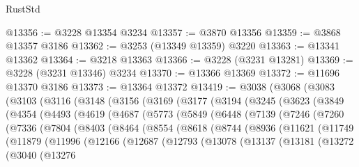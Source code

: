 \begin{lexlean}{RustStd}
\begin{coremodule}
{\begin{coremodule}
{{{{{{{{{{{{{{{{{{{{{{{{{{{{{{{{{{{{{@13356 := @3228 @13354 @3234
@13357 := @3870 @13356
@13359 := @3868 @13357 @3186
@13362 := @3253 (@13349 @13359) @3220
@13363 := @13341 @13362
@13364 := @3218 @13363
@13366 := @3228 (@3231 @13281)
@13369 := @3228 (@3231 @13346) @3234
@13370 := @13366 @13369
@13372 := @11696 @13370 @3186
@13373 := @13364 @13372
@13419 := @3038
    (@3068
      (@3083
        (@3103
          (@3116
            (@3148
              (@3156
                (@3169
                  (@3177
                    (@3194
                      (@3245
                        (@3623
                          (@3849
                            (@4354
                              (@4493
                                (@4619
                                  (@4687
                                    (@5773
                                      (@5849
                                        (@6448
                                          (@7139
                                            (@7246
                                              (@7260
                                                (@7336
                                                  (@7804
                                                    (@8403
                                                      (@8464
                                                        (@8554
                                                          (@8618
                                                            (@8744
                                                              (@8936
                                                                (@11621
                                                                  (@11749
                                                                    (@11879
                                                                      (@11996
                                                                        (@12166
                                                                          (@12687
                                                                            (@12793
                                                                              (@13078
                                                                                (@13137
                                                                                  (@13181
                                                                                    (@13272
                                                                                      (@3040
                                                                                        (@13276
}}}}}}}}}}}}}}}}}}}}}}}}}}}}}}}}}}}}}
\end{coremodule}}
\end{coremodule}
\end{lexlean}
